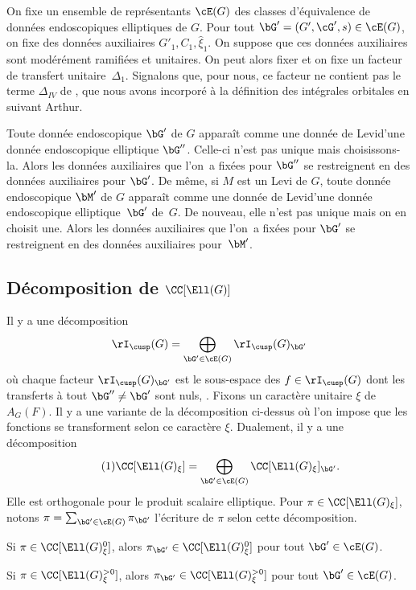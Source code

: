On fixe un ensemble de représentants $\cE(G)$ des classes d'équivalence de données endoscopiques elliptiques de $G$.
Pour tout $\bG'=(G',\cG',s)\in \cE(G)$, on fixe des données auxiliaires $G'_{1},C_{1},\hat{\xi}_{1}$.
On suppose que ces données auxiliaires sont modérément ramifiées et unitaires. On peut alors fixer et on fixe un facteur de transfert unitaire~$\Delta_{1}$. Signalons que, pour nous, ce facteur ne contient pas le terme $\Delta_{\textit{IV}}$ de \cite{LS}, que nous avons incorporé à la définition des intégrales orbitales en suivant Arthur.

Toute donnée endoscopique $\bG'$ de $G$ apparaît comme une \og donnée de Levi\fg d'une donnée endoscopique elliptique $\bG''$. Celle-ci n'est pas unique mais choisissons-la. Alors les données auxiliaires que l'on~a fixées pour $\bG''$ se restreignent en des données auxiliaires pour $\bG'$. De même, si $M$ est un Levi de $G$, toute donnée endoscopique $\bM'$ de $G$ apparaît comme une \og donnée de Levi\fg d'une donnée endoscopique elliptique~$\bG'$ de~$G$. De nouveau, elle n'est pas unique mais on en choisit une. Alors les données auxiliaires que l'on~a fixées pour $\bG'$ se restreignent en des données auxiliaires pour~$\bM'$.

\subsection{Décomposition de \texorpdfstring{$\CC[\Ell(G)]$}{CLG}}\label{decomposition}

Il y a une décomposition
\[
\rI_{\cusp}(G)=\bigoplus_{\bG'\in\cE(G)}\rI_{\cusp}(G)_{\bG'}
\]
où chaque facteur $\rI_{\cusp}(G)_{\bG'}$ est le sous-espace des $f\in \rI_{\cusp}(G)$ dont les transferts à tout $\bG''\neq\bG'$ sont nuls, \cf \cite[Prop.\,I.4.11]{MW}. Fixons un caractère unitaire $\xi$ de $A_{G}(F)$. Il y a une variante de la décomposition ci-dessus où l'on impose que les fonctions se transforment selon ce caractère $\xi$. Dualement, il y a une décomposition
\begin{equation}\tag{1}\label{decomposition1}
\CC[\Ell(G)_{\xi}]=\bigoplus_{\bG'\in\cE(G)}\CC[\Ell(G)_{\xi}]_{\bG'}.
\end{equation}
Elle est orthogonale pour le produit scalaire elliptique. Pour $\pi\in \CC[\Ell(G)_{\xi}]$, notons $\pi=\sum_{\bG'\in \cE(G)}\pi_{\bG'}$ l'écriture de $\pi$ selon cette décomposition.

\skpt
\begin{prop*}
\begin{enumeratei}
\item\label{decompositioni}
Si $\pi\in \CC[\Ell(G)^0_{\xi}]$, alors $\pi_{\bG'}\in \CC[\Ell(G)^0_{\xi}]$ pour tout $\bG'\in \cE(G)$.

\item\label{decompositionii}
Si $\pi\in \CC[\Ell(G)^{>0}_{\xi}]$, alors $\pi_{\bG'}\in \CC[\Ell(G)^{>0}_{\xi}]$ pour tout $\bG'\in \cE(G)$.
\end{enumeratei}
\end{prop*}

